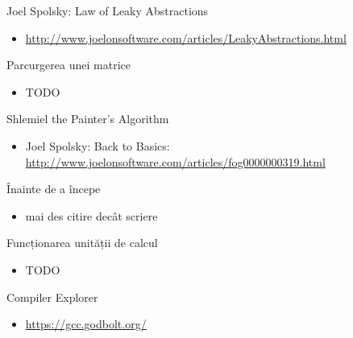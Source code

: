 \documentclass{beamer}
\begin{document}
\begin{frame}{Joel Spolsky: Law of Leaky Abstractions}
  \begin{itemize}
    \item \url{http://www.joelonsoftware.com/articles/LeakyAbstractions.html}
  \end{itemize}
\end{frame}

\begin{frame}{Parcurgerea unei matrice}
  \begin{itemize}
    \item TODO
  \end{itemize}
\end{frame}

\begin{frame}{Shlemiel the Painter's Algorithm}
  \begin{itemize}
    \item Joel Spolsky: Back to Basics: \url{http://www.joelonsoftware.com/articles/fog0000000319.html}
  \end{itemize}
\end{frame}

\begin{frame}{Înainte de a începe}
  \begin{itemize}
    \item mai des citire decât scriere
  \end{itemize}
\end{frame}

\begin{frame}{Funcționarea unității de calcul}
  \begin{itemize}
    \item TODO
  \end{itemize}
\end{frame}

\begin{frame}{Compiler Explorer}
  \begin{itemize}
    \item \url{https://gcc.godbolt.org/}
  \end{itemize}
\end{frame}

\end{document}
